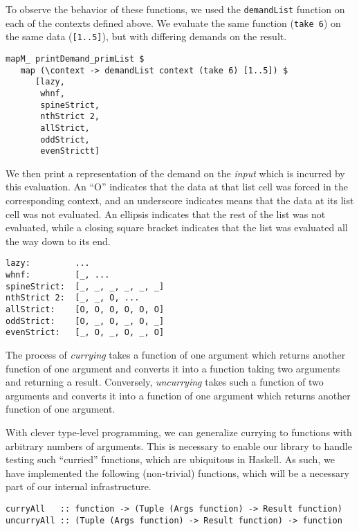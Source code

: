\documentclass{article}
\begin{document}
To observe the behavior of these functions, we used the \verb|demandList|
function on each of the contexts defined above. We evaluate the same function
(\verb|take 6|) on the same data (\verb|[1..5]|), but with differing demands on
the result.

\begin{verbatim}
mapM_ printDemand_primList $
   map (\context -> demandList context (take 6) [1..5]) $
      [lazy,
       whnf,
       spineStrict,
       nthStrict 2,
       allStrict,
       oddStrict,
       evenStrictt]
\end{verbatim}

We then print a representation of the demand on the \emph{input} which is
incurred by this evaluation. An ``O'' indicates that the data at
that list cell was forced in the corresponding context, and an underscore
indicates means that the data at its list cell was not evaluated. An ellipsis
indicates that the rest of the list was not evaluated, while a closing square
bracket indicates that the list was evaluated all the way down to its end.

\begin{verbatim}
lazy:         ...
whnf:         [_, ...
spineStrict:  [_, _, _, _, _, _]
nthStrict 2:  [_, _, O, ...
allStrict:    [O, O, O, O, O, O]
oddStrict:    [O, _, O, _, O, _]
evenStrict:   [_, O, _, O, _, O]
\end{verbatim}

The process of \emph{currying} takes a function of one argument which returns
another function of one argument and converts it into a function taking two
arguments and returning a result. Conversely, \emph{uncurrying} takes such a
function of two arguments and converts it into a function of one argument which
returns another function of one argument.

With clever type-level programming, we can generalize currying to functions with
arbitrary numbers of arguments. This is necessary to enable our library to
handle testing such ``curried'' functions, which are ubiquitous in Haskell. As
such, we have implemented the following (non-trivial) functions, which will be a
necessary part of our internal infrastructure.

\begin{verbatim}
curryAll   :: function -> (Tuple (Args function) -> Result function)
uncurryAll :: (Tuple (Args function) -> Result function) -> function
\end{verbatim}
\end{document}
